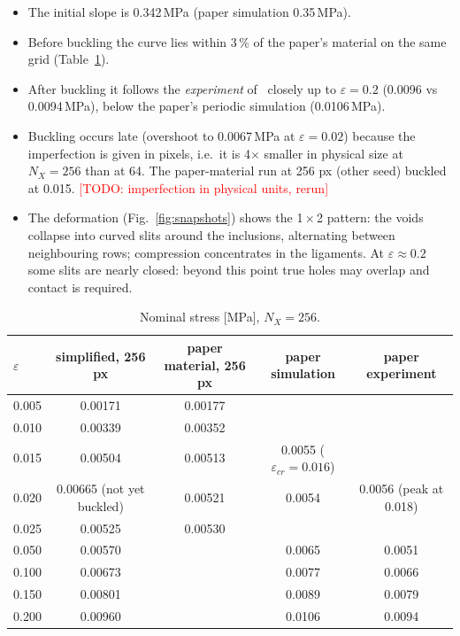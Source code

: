 \documentclass[11pt,a4paper]{article}
\newcommand{\todo}[1]{\textcolor{red}{[TODO: #1]}}
\begin{document}
\begin{itemize}
\item The initial slope is 0.342\,MPa (paper simulation 0.35\,MPa).
\item Before buckling the curve lies within 3\,\% of the paper's material on the same grid
(Table~\ref{tab:256}).
\item After buckling it follows the \emph{experiment} of~\cite{LiRudykh2019} closely up to $\varepsilon = 0.2$
(0.0096 vs 0.0094\,MPa), below the paper's periodic simulation (0.0106\,MPa).
\item Buckling occurs late (overshoot to 0.0067\,MPa at $\varepsilon = 0.02$) because the imperfection is given in
pixels, i.e.\ it is 4$\times$ smaller in physical size at $N_X = 256$ than at 64. The paper-material run at 256 px
(other seed) buckled at 0.015. \todo{imperfection in physical units, rerun}
\item The deformation (Fig.~\ref{fig:snapshots}) shows the 1\,$\times$\,2 pattern: the voids collapse into curved
slits around the inclusions, alternating between neighbouring rows; compression concentrates in the ligaments. At
$\varepsilon \approx 0.2$ some slits are nearly closed: beyond this point true holes may overlap and contact is
required.
\end{itemize}

\begin{table}[h]
\centering
\caption{Nominal stress [MPa], $N_X = 256$.}
\label{tab:256}
\small
\begin{tabular}{lcccc}
\toprule
$\varepsilon$ & simplified, 256 px & paper material, 256 px & paper simulation & paper experiment \\
\midrule
0.005 & 0.00171 & 0.00177 & & \\
0.010 & 0.00339 & 0.00352 & & \\
0.015 & 0.00504 & 0.00513 & 0.0055 ($\varepsilon_{cr} = 0.016$) & \\
0.020 & 0.00665 (not yet buckled) & 0.00521 & 0.0054 & 0.0056 (peak at 0.018) \\
0.025 & 0.00525 & 0.00530 & & \\
0.050 & 0.00570 & & 0.0065 & 0.0051 \\
0.100 & 0.00673 & & 0.0077 & 0.0066 \\
0.150 & 0.00801 & & 0.0089 & 0.0079 \\
0.200 & 0.00960 & & 0.0106 & 0.0094 \\
\bottomrule
\end{tabular}
\end{table}
\end{document}
